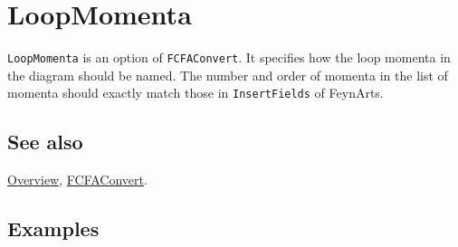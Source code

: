 \documentclass[../FeynCalcManual.tex]{subfiles}
\begin{document}
\hypertarget{loopmomenta}{%
\section{LoopMomenta}\label{loopmomenta}}

\texttt{LoopMomenta} is an option of \texttt{FCFAConvert}. It specifies
how the loop momenta in the diagram should be named. The number and
order of momenta in the list of momenta should exactly match those in
\texttt{InsertFields} of FeynArts.

\subsection{See also}

\hyperlink{toc}{Overview}, \hyperlink{fcfaconvert}{FCFAConvert}.

\subsection{Examples}
\end{document}
